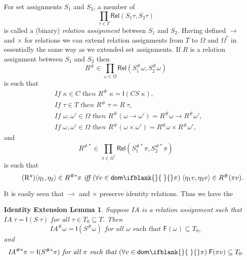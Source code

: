 \documentclass[sigplan,screen,nonacm,balance=false]{acmart}
\theoremstyle{plain}
\DeclarePairedDelimiter{\pair}{\langle}{\rangle}
\newcommand{\dom}[1]{\mathsf{dom}\ifblank{#1}{\;}{#1}}
\newcommand{\FV}{\mathsf{F}}
\newcommand{\Rel}{\mathsf{Rel}}
\newcommand{\Id}{\mathsf{I}}
\newcommand{\CS}{\mathit{CS}}
\newcommand{\IA}{\mathit{IA}}
\begin{document}
For set assignments $S_1$ and $S_2$, a member of
%
\begin{equation*}
  \prod_{\tau \in T} \Rel(S_1 \tau, S_2 \tau)
\end{equation*}
%
is called a (binary) \emph{relation assignment} between $S_1$ and $S_2$.
Having defined $\to$ and $\times$ for relations we can extend relation assignments from $T$ to $\Omega$ and $\Omega^*$ in essentially the same way as we extended set assignments.
If $R$ is a relation assignment between $S_1$ and $S_2$ then
%
\begin{equation*}
  R^\# \in \prod_{\omega \in \Omega} \Rel(S_1^\# \omega, S_2^\# \omega)
\end{equation*}
%
is such that
%
\begin{align}
  \tag{R1}
  &\textit{If } \kappa \in C  \textit{ then } R^\# \; \kappa = \Id(\CS \; \kappa), \\
  \tag{R2}
  &\textit{If } \tau \in T  \textit{ then } R^\# \; \tau = R \; \tau, \\
  \tag{R3}
  &\textit{If } \omega, \omega' \in \Omega \textit{ then } R^\#(\omega \to \omega') = R^\# \omega \to R^\# \omega', \\
  \tag{R4}
  &\textit{If } \omega, \omega' \in \Omega \textit{ then } R^\#(\omega \times \omega') = R^\# \omega \times R^\# \omega',
\end{align}
%
and
%
\begin{equation*}
  R^{\#*} \in \prod_{\pi \in \Omega^*} \Rel(S_1^{\#*} \pi, S_2^{\#*} \pi)
\end{equation*}
%
is such that
%
\begin{equation}
  \tag{R*}
  \pair{\eta_1, \eta_2} \in R^{\#*} \pi \textit{ iff } (\forall v \in \dom{} \pi) \; \pair{\eta_1 v, \eta_2 v} \in R^\#(\pi v).
\end{equation}

It is easily seen that $\to$ and $\times$ preserve identity relations.
Thus we have the

\newtheorem*{IEL}{Identity Extension Lemma}
\begin{IEL}
  Suppose $\IA$ is a relation assignment such that $\IA \; \tau = \Id(S \; \tau)$ for all $\tau \in T_0 \subseteq T$. Then
  \begin{equation*}
    \IA^\# \omega = \Id(S^\# \omega) \textit{ for all } \omega \textit{ such that } \FV(\omega) \subseteq T_0,
  \end{equation*}
  and
  \begin{equation*}
    \IA^{\#*} \pi = \Id(S^{\#*} \pi) \textit{ for all } \pi \textit{ such that } (\forall v \in \dom{} \pi) \; \FV(\pi v) \subseteq T_0.
  \end{equation*}
\end{IEL}
\end{document}
